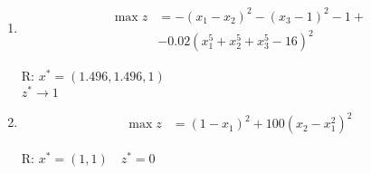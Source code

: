 \documentclass[italian,12pt]{article}
\begin{document}
\begin{enumerate}
	\item 
	\begin{minipage}{0.50\textwidth}
		\begin{equation*}
			\begin{split}
				\max z &= -(x_1 - x_2)^2 - (x_3 - 1)^2 - 1 + \\
				& - 0.02 (x_1^5 +x_2^5 + x_3^5 - 16)^2
			\end{split}
		\end{equation*}
	\end{minipage}
	\begin{minipage}{0.40\textwidth}
		\begin{flushright}
			R: $x^* = (1.496, 1.496, 1)$\\
			$z^* \rightarrow 1$
		\end{flushright}
	\end{minipage}
	
	\item 
	\begin{minipage}{0.50\textwidth}
		\begin{equation*}
			\begin{split}
				\max z &= (1 - x_1)^2 + 100 (x_2 - x_1^2)^2
			\end{split}
		\end{equation*}
	\end{minipage}
	\begin{minipage}{0.40\textwidth}
		\begin{flushright}
			R: $x^* = (1, 1) \quad z^* = 0$
		\end{flushright}
	\end{minipage}
	
\end{enumerate}
\end{document}
